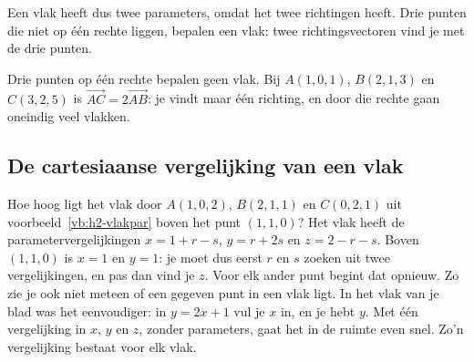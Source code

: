 Een vlak heeft dus twee parameters, omdat het twee richtingen heeft. Drie punten die niet op één rechte liggen, bepalen een vlak: twee richtingsvectoren vind je met de drie punten.


Drie punten op één rechte bepalen geen vlak. Bij $A(1, 0, 1)$, $B(2, 1, 3)$ en $C(3, 2, 5)$ is $\overrightarrow{AC} = 2\overrightarrow{AB}$: je vindt maar één richting, en door die rechte gaan oneindig veel vlakken.

\begin{oefeningen}
\end{oefeningen}

\subsection{De cartesiaanse vergelijking van een vlak}

Hoe hoog ligt het vlak door $A(1, 0, 2)$, $B(2, 1, 1)$ en $C(0, 2, 1)$ uit voorbeeld~\ref{vb:h2-vlakpar} boven het punt $(1, 1, 0)$? Het vlak heeft de parametervergelijkingen $x = 1 + r - s$, $y = r + 2s$ en $z = 2 - r - s$. Boven $(1, 1, 0)$ is $x = 1$ en $y = 1$: je moet dus eerst $r$ en $s$ zoeken uit twee vergelijkingen, en pas dan vind je $z$. Voor elk ander punt begint dat opnieuw. Zo zie je ook niet meteen of een gegeven punt in een vlak ligt. In het vlak van je blad was het eenvoudiger: in $y = 2x + 1$ vul je $x$ in, en je hebt $y$. Met één vergelijking in $x$, $y$ en $z$, zonder parameters, gaat het in de ruimte even snel. Zo'n vergelijking bestaat voor elk vlak.

